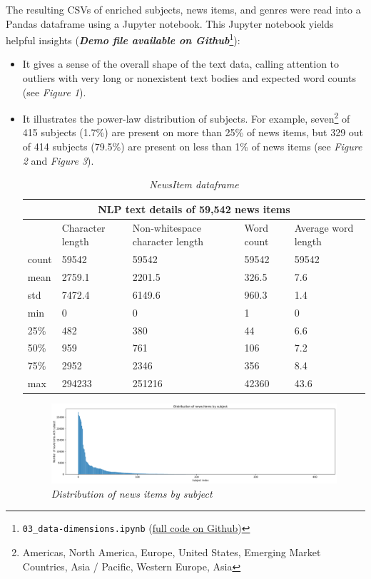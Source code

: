 \documentclass[11pt]{article}
\begin{document}
    The resulting CSVs of enriched subjects, news items, and genres were read into a Pandas dataframe using a Jupyter notebook. This Jupyter notebook yields helpful insights (\textit{\textbf{Demo file available on Github}}\footnote{\lstinline{03_data-dimensions.ipynb} (\href{https://github.com/Birkbeck/msc-data-science-project-2020_21---files-heychrisek/}{full code on Github})}):
    \begin{itemize}
      \item{It gives a sense of the overall shape of the text data, calling attention to outliers with very long or nonexistent text bodies and expected word counts (see \textit{Figure 1}).}

      \item{It illustrates the power-law distribution of subjects. For example, seven\footnote{Americas, North America, Europe, United States, Emerging Market Countries, Asia / Pacific, Western Europe, Asia} of 415 subjects (1.7\%) are present on more than 25\% of news items, but 329 out of 414 subjects (79.5\%) are present on less than 1\% of news items (see \textit{Figure 2} and \textit{Figure 3}).

      \begin{table}
        \begin{tabular}{ |p{1cm}|p{2.25cm}|p{2.25cm}|p{2.25cm}|p{2.25cm}|  }
        \hline
        \multicolumn{5}{|c|}{NLP text details of 59,542 news items} \\
        \hline
        &Character length&Non-whitespace character length&Word count&Average word length\\
        \hline
        count&59542&59542&59542&59542\\
        mean&2759.1&2201.5&326.5&7.6\\
        std&7472.4&6149.6&960.3&1.4\\
        min&0&0&1&0\\
        25\%&482&380&44&6.6\\
        50\%&959&761&106&7.2\\
        75\%&2952&2346&356&8.4\\
        max&294233&251216&42360&43.6\\
        \hline
        \end{tabular}
        \caption{\textit{NewsItem dataframe}}
      \end{table}

      \begin{figure}
        \centerline{\includegraphics[scale=0.35]{distribution_news_item_subject}}
        \caption{\textit{Distribution of news items by subject}}
      \end{figure}

}
\end{itemize}
\end{document}
